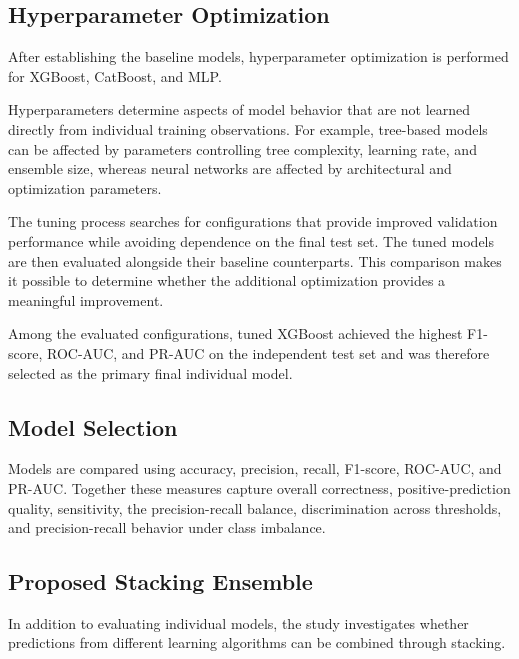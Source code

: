 \documentclass[conference]{IEEEtran}
\begin{document}
\subsection{Hyperparameter Optimization}

After establishing the baseline models, hyperparameter optimization is performed for XGBoost, CatBoost, and MLP.

Hyperparameters determine aspects of model behavior that are not learned directly from individual training observations. For example, tree-based models can be affected by parameters controlling tree complexity, learning rate, and ensemble size, whereas neural networks are affected by architectural and optimization parameters.

The tuning process searches for configurations that provide improved validation performance while avoiding dependence on the final test set. The tuned models are then evaluated alongside their baseline counterparts. This comparison makes it possible to determine whether the additional optimization provides a meaningful improvement.

Among the evaluated configurations, tuned XGBoost achieved the highest F1-score, ROC-AUC, and PR-AUC on the independent test set and was therefore selected as the primary final individual model.

\subsection{Model Selection}

Models are compared using accuracy, precision, recall, F1-score, ROC-AUC, and PR-AUC. Together these measures capture overall correctness, positive-prediction quality, sensitivity, the precision-recall balance, discrimination across thresholds, and precision-recall behavior under class imbalance.

\subsection{Proposed Stacking Ensemble}

In addition to evaluating individual models, the study investigates whether predictions from different learning algorithms can be combined through stacking.
\end{document}
